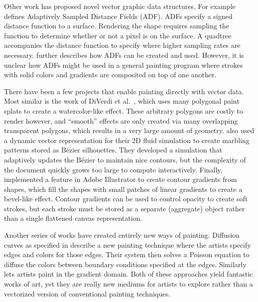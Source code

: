 \documentclass[review]{acmsiggraph}
\begin{document}
Other work has proposed novel vector graphic data structures. For example \cite{Frisken:2000:ASD:344779.344899}
defines Adaptively Sampled Distance Fields (ADF). ADFs specify a signed distance function to a surface.
Rendering the shape requires sampling the function to determine whether or not a pixel is on the surface.
A quadtree accompanies the distance function to specify where higher sampling rates are necessary. \cite{Bremer:2001:VCM}
further describes how ADFs can be created and used. However, it is unclear how ADFs might be used in a general
painting program where strokes with solid colors and gradients are composited on top of one another.

There have been a few projects that enable painting directly with vector data.  Most similar is the work of DiVerdi et al.~, which uses many polygonal paint splats to create a watercolor-like effect.  These arbitrary polygons are costly to render however, and ``smooth'' effects are only created via many overlapping transparent polygons, which results in a very large amount of geometry.  \cite{ando2010} also used a dynamic vector representation for their 2D fluid simulation to create marbling patterns stored as B\'{e}zier silhouettes.  They developed a simulation that adaptively updates the B\'{e}zier to maintain nice contours, but the complexity of the document quickly grows too large to compute interactively.  Finally, \cite{asente2013} implemented a feature in Adobe Illustrator to create contour gradients from shapes, which fill the shapes with small patches of linear gradients to create a bevel-like effect.  Contour gradients can be used to control opacity to create soft strokes, but each stroke must be stored as a separate (aggregate) object rather than a single flattened canvas representation.

Another series of works have created entirely new ways of painting. Diffusion curves as specified in \cite{Orzan:2008:DCV:1360612.1360691}
describe a new painting technique where the artists specify edges and colors for those edges. Their system
then solves a Poisson equation to diffuse the colors between boundary conditions specified at the edges.
Similarly \cite{McCann:2008:RGP:1360612.1360692}
lets artists paint in the gradient domain. Both of these approaches yield fantastic works of art, yet
they are really new mediums for artists to explore rather than a vectorized version of conventional
painting techniques.
\end{document}
